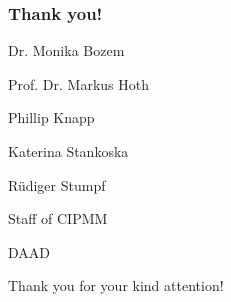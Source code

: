 \documentclass{beamer}
\begin{document}
\begin{frame} %

\centering
\frametitle{Thank you!}

Dr. Monika Bozem

Prof. Dr. Markus Hoth

Phillip Knapp

Katerina Stankoska

Rüdiger Stumpf

Staff of CIPMM

\vspace{1 cm}

DAAD

\vspace{1 cm}

Thank you for your kind attention!

\end{frame}
\end{document}
